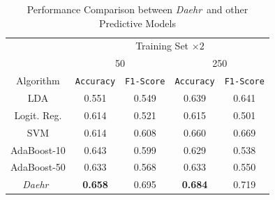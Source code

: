 \documentclass[journal,compsoc]{IEEEtran}
\newcommand{\TheName}{\mbox{\emph{Daehr}}}
\begin{document}
\begin{table}
\footnotesize{
\begin{center}
\caption{Performance Comparison between \TheName\ and other Predictive Models}
		\label{tab:table13_compressed}
\begin{tabular}{*{5}{c}}
\toprule
    &  \multicolumn{4}{c}{Training Set $ \times 2$}\\
    \cmidrule(lr){2-5}
    &  
    \multicolumn{2}{c}{50} &
    \multicolumn{2}{c}{250} \\
\cmidrule(lr){2-3}
\cmidrule(lr){4-5}
Algorithm & \texttt{Accuracy} & \texttt{F1-Score}&
                           \texttt{Accuracy} & \texttt{F1-Score} \\
 \cmidrule(lr){1-1}                        
 \cmidrule(lr){2-3}
\cmidrule(lr){4-5}
    LDA &   0.551 & 0.549  &     0.639 & 0.641  \\

     \cmidrule(lr){1-1}                        
 \cmidrule(lr){2-3}
\cmidrule(lr){4-5}
    Logit. Reg. &   0.614 & 0.521  &     0.615 & 0.501 \\

    \cmidrule(lr){1-1}                        
 \cmidrule(lr){2-3}
\cmidrule(lr){4-5}
    SVM  &   0.614 & 0.608 &     0.660 & 0.669  \\
    \cmidrule(lr){1-1}                        
 \cmidrule(lr){2-3}
\cmidrule(lr){4-5}

   AdaBoost-10 &   0.643 & 0.599 &     0.629 & 0.538   \\   
   \cmidrule(lr){1-1}                        
 \cmidrule(lr){2-3}
\cmidrule(lr){4-5}

    AdaBoost-50 &    0.633 & 0.568 &     0.633 & 0.550       \\

     \cmidrule(lr){1-1}                        
 \cmidrule(lr){2-3}
\cmidrule(lr){4-5}
     \TheName\ &  \textbf{0.658} & 0.695  &     \textbf{0.684} & 0.719      \\

     \bottomrule

\end{tabular}

\end{center}
}
\end{table}
\end{document}
